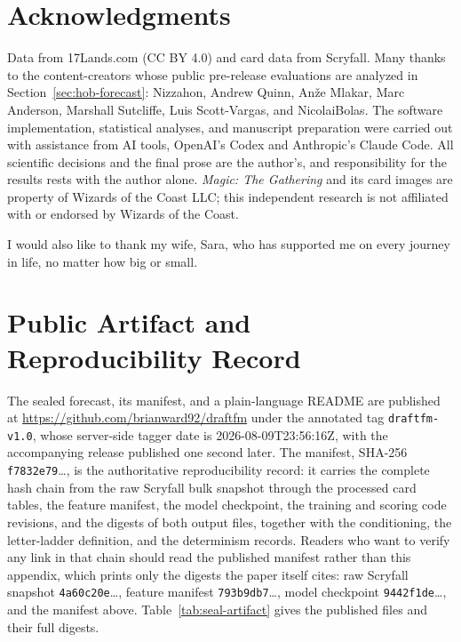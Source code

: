 \documentclass[11pt]{article}
\numberwithin{equation}{section}
\begin{document}
\section*{Acknowledgments}

Data from 17Lands.com (CC BY 4.0) and card data from Scryfall. Many thanks to
the content-creators whose public pre-release evaluations are analyzed in
Section~\ref{sec:hob-forecast}: Nizzahon, Andrew Quinn, An\v{z}e Mlakar,
Marc Anderson, Marshall Sutcliffe, Luis Scott-Vargas, and NicolaiBolas. The
software implementation, statistical analyses, and manuscript preparation
were carried out with assistance from AI tools, OpenAI's Codex and
Anthropic's Claude Code. All scientific decisions and the final prose are
the author's, and responsibility for the results rests with the author
alone. \emph{Magic: The Gathering} and its card images are property of
Wizards of the Coast LLC; this independent research is not affiliated with
or endorsed by Wizards of the Coast.

\medskip
\noindent I would also like to thank my wife, Sara, who has supported me on every
journey in life, no matter how big or small.

\appendix

\section{Public Artifact and Reproducibility Record}
\label{app:reproducibility}

The sealed forecast, its manifest, and a plain-language README are published at
\url{https://github.com/brianward92/draftfm} under the annotated tag
\texttt{draftfm-v1.0}, whose server-side tagger date is 2026-08-09T23:56:16Z,
with the accompanying release published one second later. The manifest, SHA-256
\texttt{f7832e79}\ldots, is the authoritative reproducibility record: it carries
the complete hash chain from the raw Scryfall bulk snapshot through the processed
card tables, the feature manifest, the model checkpoint, the training and scoring
code revisions, and the digests of both output files, together with the
conditioning, the letter-ladder definition, and the determinism records. Readers
who want to verify any link in that chain should read the published manifest
rather than this appendix, which prints only the digests the paper itself cites:
raw Scryfall snapshot \texttt{4a60c20e}\ldots, feature manifest
\texttt{793b9db7}\ldots, model checkpoint \texttt{9442f1de}\ldots, and the
manifest above. Table~\ref{tab:seal-artifact} gives the published files and their
full digests.
\end{document}
